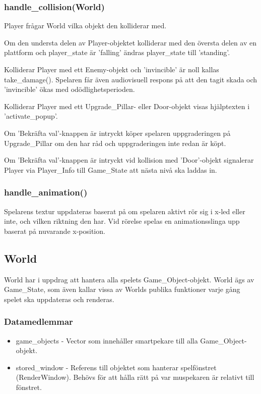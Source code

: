 \documentclass{TDP005mall}
\begin{document}
\subsubsection{handle\_collision(World)}
Player frågar World vilka objekt den kolliderar med. 

Om den understa delen av Player-objektet kolliderar med den översta delen av en plattform och player\_state är 'falling' ändras player\_state till 'standing'.

Kolliderar Player med ett Enemy-objekt och 'invincible' är noll kallas take\_damage(). Spelaren får även audiovisuell respons på att den tagit skada och 'invincible' ökas med odödlighetsperioden.

Kolliderar Player med ett Upgrade\_Pillar- eller  Door-objekt visas hjälptexten i 'activate\_popup'.

Om 'Bekräfta val'-knappen är intryckt köper spelaren uppgraderingen på Upgrade\_Pillar om den har råd och uppgraderingen inte redan är köpt. 

Om 'Bekräfta val'-knappen är intryckt vid kollision med 'Door'-objekt signalerar Player via Player\_Info till Game\_State att nästa nivå ska laddas in.

\subsubsection{handle\_animation()}
Spelarens textur uppdateras baserat på om spelaren aktivt rör sig i x-led eller inte, och vilken riktning den har. Vid rörelse spelas en animationsslinga upp baserat på nuvarande x-position.

\subsection{World}
World har i uppdrag att hantera alla spelets Game\_Object-objekt. World ägs av Game\_State, som även kallar vissa av Worlds publika funktioner varje gång spelet ska uppdateras och renderas.  

\subsubsection{Datamedlemmar}
\begin{itemize}
\item game\_objects  - Vector som innehåller smartpekare till alla Game\_Object-objekt.
\item stored\_window - Referens till objektet som hanterar spelfönstret (RenderWindow). Behövs för att hålla rätt på var muspekaren är relativt till fönstret.
\end{itemize}
\end{document}
